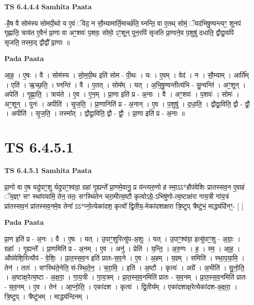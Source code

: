 \documentclass[17pt]{extarticle}
\begin{document}
\textbf{TS 6.4.4.4 } \newline
\textbf{Samhita Paata} \newline

-है॒ष वै सोम॑स्य सोमपी॒थो य ए॒वं ॅवेद॒ न सौ॒म्यामार्ति॒मार्च्छ॑ति॒ घ्नन्ति॒ वा ए॒तथ् सोमं॒ ॅयद॑भिषु॒ण्वन्त्यꣳ॒॒ शूनप॑ गृह्णाति॒ त्राय॑त ए॒वैनं॑ प्रा॒णा वा अꣳ॒॒शवः॑ प॒शवः॒ सोमो॒ ऽꣳ॒शून् पुन॒रपि॑ सृजति प्रा॒णाने॒व प॒शुषु॑ दधाति॒ द्वौद्वा॒वपि॑ सृजति॒ तस्मा॒द् द्वौद्वौ᳚ प्रा॒णाः ॥ \newline

\textbf{Pada Paata} \newline

आ॒ह॒ । ए॒षः । वै । सोम॑स्य । सो॒म॒पी॒थ इति॑ सोम - पी॒थः । यः । ए॒वम् । वेद॑ । न । सौ॒म्याम् । आर्ति᳚म् । एति॑ । ऋ॒च्छ॒ति॒ । घ्नन्ति॑ । वै । ए॒तत् । सोम᳚म् । यत् । अ॒भि॒षु॒ण्वन्तीत्य॑भि - सु॒न्वन्ति॑ । अꣳ॒॒शून् । अपेति॑ । गृ॒ह्णा॒ति॒ । त्राय॑ते । ए॒व । ए॒न॒म् । प्रा॒णा इति॑ प्र - अ॒नाः । वै । अꣳ॒॒शवः॑ । प॒शवः॑ । सोमः॑ । अꣳ॒॒शून् । पुनः॑ । अपीति॑ । सृ॒ज॒ति॒ । प्रा॒णानिति॑ प्र - अ॒नान् । ए॒व । प॒शुषु॑ । द॒धा॒ति॒ । द्वौद्वा॒विति॒ द्वौ - द्वौ॒ । अपीति॑ । सृ॒ज॒ति॒ । तस्मा᳚त् । द्वौद्वा॒विति॒ द्वौ - द्वौ॒ । प्रा॒णा इति॑ प्र - अ॒नाः ॥  \newline





\section{ TS 6.4.5.1 }

\textbf{TS 6.4.5.1 } \newline
\textbf{Samhita Paata} \newline

प्रा॒णो वा ए॒ष यदु॑पाꣳ॒॒शु र्यदुपाꣳ॒॒श्व॑ग्रा॒ ग्रहा॑ गृ॒ह्यन्ते᳚ प्रा॒णमे॒वानु॒ प्र य॑न्त्यरु॒णो ह॑ स्मा॒ऽऽ*हौप॑वेशिः प्रातस्सव॒न ए॒वाहं ॅय॒ज्ञ्ꣳ सꣳ स्था॑पयामि॒ तेन॒ ततः॒ सꣳस्थि॑तेन चरा॒मीत्य॒ष्टौ कृत्वोऽग्रे॒-ऽभिषु॑णो-त्य॒ष्टाक्ष॑रा गाय॒त्री गा॑य॒त्रं प्रा॑तस्सव॒नं प्रा॑तस्सव॒नमे॒व तेना᳚ ऽऽ*प्नो॒त्येका॑दश॒ कृत्वो᳚ द्वि॒तीय॒-मेका॑दशाक्षरा त्रि॒ष्टुप् त्रैष्टु॑भं॒ माद्ध्य॑दिंनꣳ॒॒- [  ] \newline

\textbf{Pada Paata} \newline

प्रा॒ण इति॑ प्र - अ॒नः । वै । ए॒षः । यत् । उ॒पाꣳ॒॒शुरित्यु॑प-अ॒शुः । यत् । उ॒पाꣳ॒॒श्व॑ग्रा॒ इत्यु॑पाꣳ॒॒शु - अ॒ग्राः॒ । ग्रहाः᳚ । गृ॒ह्यन्ते᳚ । प्रा॒णमिति॑ प्र - अ॒नम् । ए॒व । अनु॑ । प्रेति॑ । य॒न्ति॒ । अ॒रु॒णः । ह॒ । स्म॒ । आ॒ह॒ । औप॑वेशि॒रित्यौप॑ - वे॒शिः॒ । प्रा॒त॒स्स॒व॒न इति॑ प्रातः-स॒व॒ने । ए॒व । अ॒हम् । य॒ज्ञ्म् । समिति॑ । स्था॒प॒या॒मि॒ । तेन॑ । ततः॑ । सꣳस्थि॑ते॒नेति॒ सं-स्थि॒ते॒न॒ । च॒रा॒मि॒ । इति॑ । अ॒ष्टौ । कृत्वः॑ । अग्रे᳚ । अ॒भीति॑ । सु॒नो॒ति॒ । अ॒ष्टाक्ष॒रेत्य॒ष्टा - अ॒क्ष॒रा॒ । गा॒य॒त्री । गा॒य॒त्रम् । प्रा॒त॒स्स॒व॒नमिति॑ प्रातः - स॒व॒नम् । प्रा॒त॒स्स॒व॒नमिति॑ प्रातः - स॒व॒नम् । ए॒व । तेन॑ । आ॒प्नो॒ति॒ । एका॑दश । कृत्वः॑ । द्वि॒तीय᳚म् । एका॑दशाक्ष॒रेत्येका॑दश-अ॒क्ष॒रा॒ । त्रि॒ष्टुप् । त्रैष्टु॑भम् । माद्ध्य॑न्दिनम् ।  \newline
\end{document}
